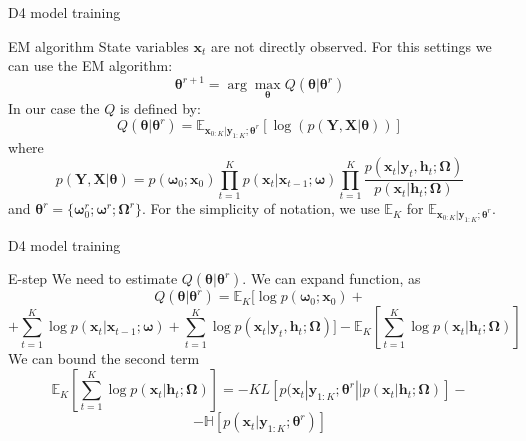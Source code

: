 \documentclass{beamer}
\begin{document}
\begin{frame}{D4 model training}
    \begin{block}{EM algorithm}
        State variables $\boldsymbol{x}_{t}$ are not directly observed. For this settings  we can use the EM algorithm:
        \begin{equation}\label{EM_alg}
            \boldsymbol{\theta}^{r+1} = \arg\max_{\boldsymbol{\theta}}Q(\boldsymbol{\theta} | \boldsymbol{\theta}^r)
        \end{equation}
        In our case the $Q$ is defined by:
        \begin{equation}\label{Q-func}
            Q(\boldsymbol{\theta} | \boldsymbol{\theta}^r) = \mathbb{E}_{\boldsymbol{x}_{0:K}|\boldsymbol{y}_{1:K};\boldsymbol{\theta}^r}\left[\log\left( p(\boldsymbol{Y}, \boldsymbol{X} | \boldsymbol{\theta}) \right)\right]
        \end{equation}
        where 
        $$p(\boldsymbol{Y}, \boldsymbol{X} | \boldsymbol{\theta}) = p (\boldsymbol{\omega}_0; \boldsymbol{x}_0)\prod_{t=1}^K p (\boldsymbol{x}_t | \boldsymbol{x}_{t-1}; \boldsymbol{\omega})\prod_{t=1}^K \dfrac{p (\boldsymbol{x}_t | \boldsymbol{y}_{t}, \boldsymbol{h}_{t}; \boldsymbol{\Omega})}{p (\boldsymbol{x}_t | \boldsymbol{h}_{t}; \boldsymbol{\Omega})}$$
        and $\boldsymbol{\theta}^r = \{\boldsymbol{\omega}_0^r; \boldsymbol{\omega}^r; \boldsymbol{\Omega}^r\}$. For the simplicity of notation, we use $\mathbb{E}_K$ for $\mathbb{E}_{\boldsymbol{x}_{0:K}|\boldsymbol{y}_{1:K};\boldsymbol{\theta}^r}$.
    \end{block}
\end{frame}

\begin{frame}{D4 model training}
    \begin{block}{E-step}
        We need to estimate $Q(\boldsymbol{\theta} | \boldsymbol{\theta}^r)$. We can expand function, as
        $$Q(\boldsymbol{\theta} | \boldsymbol{\theta}^r) = \mathbb{E}_K [\log p (\boldsymbol{\omega}_0; \boldsymbol{x}_0) + $$
        $$+ \sum_{t=1}^K \log p (\boldsymbol{x}_t | \boldsymbol{x}_{t-1}; \boldsymbol{\omega}) + \sum_{t=1}^K \log p (\boldsymbol{x}_t | \boldsymbol{y}_{t}, \boldsymbol{h}_{t}; \boldsymbol{\Omega})] - \mathbb{E}_K \left[\sum_{t=1}^K \log p (\boldsymbol{x}_t | \boldsymbol{h}_{t}; \boldsymbol{\Omega})\right]$$
        We can bound the second term
        $$\mathbb{E}_K \left[\sum_{t=1}^K \log p (\boldsymbol{x}_t | \boldsymbol{h}_{t}; \boldsymbol{\Omega})\right] = - KL\left[p (\boldsymbol{x}_t | \boldsymbol{y}_{1:K}; \boldsymbol{\theta}^r || p (\boldsymbol{x}_t | \boldsymbol{h}_{t}; \boldsymbol{\Omega}) \right] - $$
        $$- \mathbb{H} \left[p (\boldsymbol{x}_t | \boldsymbol{y}_{1:K}; \boldsymbol{\theta}^r) \right]$$
    \end{block}
\end{frame}
\end{document}
